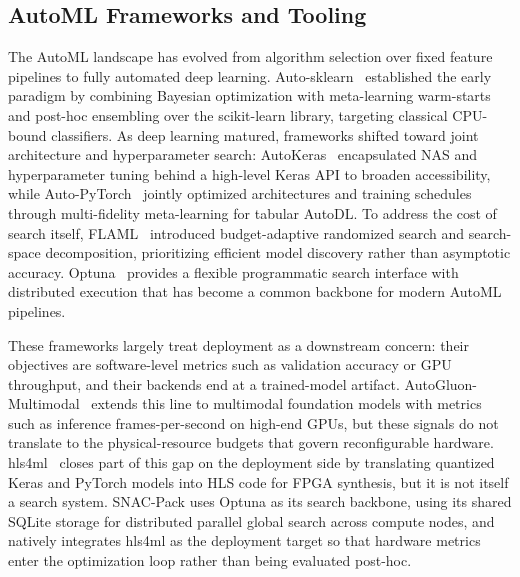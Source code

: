 \documentclass[11pt]{article}
\begin{document}
\subsection{AutoML Frameworks and Tooling}

The AutoML landscape has evolved from algorithm selection over fixed feature pipelines to fully automated deep learning.
Auto-sklearn~\citep{feurer2015efficient} established the early paradigm by combining Bayesian optimization with meta-learning warm-starts and post-hoc ensembling over the scikit-learn library, targeting classical CPU-bound classifiers.
As deep learning matured, frameworks shifted toward joint architecture and hyperparameter search: AutoKeras~\citep{jin2023autokeras} encapsulated NAS and hyperparameter tuning behind a high-level Keras API to broaden accessibility, while
Auto-PyTorch~\citep{zimmer2021auto} jointly optimized architectures
and training schedules through multi-fidelity meta-learning for
tabular AutoDL.
To address the cost of search itself, FLAML~\citep{wang2021flaml} introduced budget-adaptive randomized search and search-space decomposition, prioritizing efficient model discovery rather than asymptotic accuracy.
Optuna~\citep{optuna_2019} provides a flexible programmatic search interface with distributed execution that has become a common backbone for modern AutoML pipelines.

These frameworks largely treat deployment as a downstream concern: their objectives are software-level metrics such as validation accuracy or GPU throughput, and their backends end at a trained-model artifact.
AutoGluon-Multimodal~\citep{tang2024autogluon} extends this line to multimodal foundation models with metrics such as inference frames-per-second on high-end GPUs, but these signals do not translate to the physical-resource budgets that govern reconfigurable hardware.
hls4ml~\citep{hls4ml,fastml_hls4ml,10.1145/3801979} closes part of this gap on the deployment side by translating quantized Keras and PyTorch models into HLS code for FPGA synthesis, but it is not itself a search system.
SNAC-Pack uses Optuna as its search backbone, using its shared SQLite storage for distributed parallel global search across compute nodes, and natively integrates hls4ml as the deployment target so that hardware metrics enter the optimization loop rather than being evaluated post-hoc.
\end{document}
